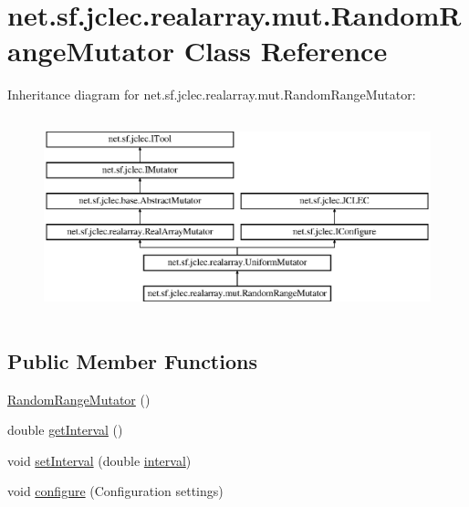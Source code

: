 \hypertarget{classnet_1_1sf_1_1jclec_1_1realarray_1_1mut_1_1_random_range_mutator}{\section{net.\-sf.\-jclec.\-realarray.\-mut.\-Random\-Range\-Mutator Class Reference}
\label{classnet_1_1sf_1_1jclec_1_1realarray_1_1mut_1_1_random_range_mutator}
}
Inheritance diagram for net.\-sf.\-jclec.\-realarray.\-mut.\-Random\-Range\-Mutator\-:\begin{figure}[H]
\begin{center}
\leavevmode
\includegraphics[height=5.793103cm]{classnet_1_1sf_1_1jclec_1_1realarray_1_1mut_1_1_random_range_mutator}
\end{center}
\end{figure}
\subsection*{Public Member Functions}
\begin{DoxyCompactItemize}
\item 
\hyperlink{classnet_1_1sf_1_1jclec_1_1realarray_1_1mut_1_1_random_range_mutator_a5f84ecbfd8c9ad7f0cbf74a1fadd2310}{Random\-Range\-Mutator} ()
\item 
double \hyperlink{classnet_1_1sf_1_1jclec_1_1realarray_1_1mut_1_1_random_range_mutator_a55b4f246262247c818436acd04d8256c}{get\-Interval} ()
\item 
void \hyperlink{classnet_1_1sf_1_1jclec_1_1realarray_1_1mut_1_1_random_range_mutator_a9190806b7f2264106585fed86202915d}{set\-Interval} (double \hyperlink{classnet_1_1sf_1_1jclec_1_1realarray_1_1mut_1_1_random_range_mutator_a2c3337c4ddd2f12713c13de5486b7c5c}{interval})
\item 
void \hyperlink{classnet_1_1sf_1_1jclec_1_1realarray_1_1mut_1_1_random_range_mutator_a5c4bb31a347fd336a6c7be4f56f9acc5}{configure} (Configuration settings)
\end{DoxyCompactItemize}
